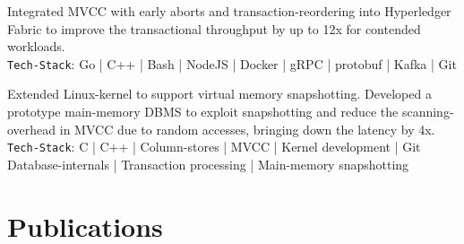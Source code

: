 \documentclass[]{deedy-resume-openfont}
\begin{document}
\begin{minipage}[t]{0.66\textwidth}
\sectionsep

Integrated MVCC with early aborts and transaction-reordering into Hyperledger Fabric to improve the transactional throughput by up to 12x for contended workloads.\\
\texttt{Tech-Stack}: Go | C++ | Bash | NodeJS | Docker | gRPC | protobuf | Kafka | Git

\sectionsep

Extended Linux-kernel to support virtual memory snapshotting. Developed a prototype main-memory DBMS to exploit snapshotting and reduce the scanning-overhead in MVCC due to random accesses, bringing down the latency by 4x.\\
\texttt{Tech-Stack}: C | C++ | Column-stores | MVCC | Kernel development | Git Database-internals | Transaction processing | Main-memory snapshotting


\section{Publications} 
\vspace*{0.5cm}
\renewcommand\refname{\vskip -1.5cm} %


\nocite{*}


\end{minipage} 
\end{document}
